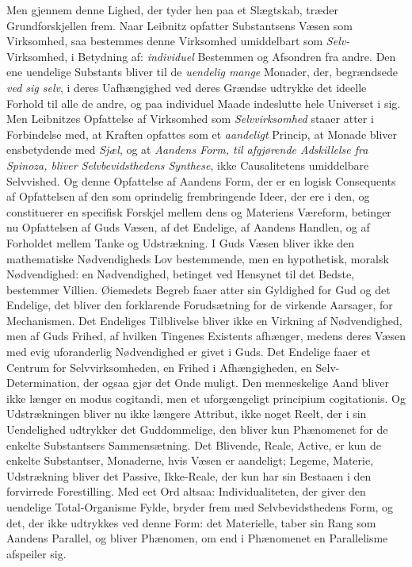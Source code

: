 \documentclass[12pt,a4paper]{book}
\newcommand{\opage}[1]{\marginnote{\footnotesize\textit{[#1]}}}
\begin{document}
Men gjennem denne Lighed, der tyder hen paa et Slægtskab,
træder Grundforskjellen frem. Naar Leibnitz opfatter
Substantsens Væsen som Virksomhed, saa bestemmes denne
Virksomhed umiddelbart som \emph{Selv-}Virksomhed, i Betydning
af: \emph{individuel} Bestemmen og Afsondren fra andre. Den
ene uendelige Substants bliver til de \emph{uendelig mange}
Monader, der, begrændsede \emph{ved sig selv}, i deres Uafhængighed
ved deres Grændse udtrykke det ideelle Forhold
til alle de andre, og paa individuel Maade indeslutte hele
Universet i sig. Men Leibnitzes Opfattelse af Virksomhed
som \emph{Selvvirksomhed} staaer atter i Forbindelse med, at
\opage{185} Kraften opfattes som et \emph{aandeligt} Princip, at Monade
bliver ensbetydende med \emph{Sjæl}, og at \emph{Aandens Form,
til afgjørende Adskillelse fra Spinoza, bliver Selvbevidsthedens
Synthese}, ikke Causalitetens umiddelbare
Selvvished. Og denne Opfattelse af Aandens Form, der er
en logisk Consequents af Opfattelsen af den som oprindelig
frembringende Ideer, der ere i den, og constituerer en specifisk
Forskjel mellem dens og Materiens Væreform, betinger
nu Opfattelsen af Guds Væsen, af det Endelige, af Aandens
Handlen, og af Forholdet mellem Tanke og Udstrækning.
I Guds Væsen bliver ikke den mathematiske Nødvendigheds
Lov bestemmende, men en hypothetisk, moralsk Nødvendighed:
en Nødvendighed, betinget ved Hensynet til det Bedste,
bestemmer Villien. Øiemedets Begreb faaer atter sin Gyldighed
for Gud og det Endelige, det bliver den forklarende
Forudsætning for de virkende Aarsager, for Mechanismen.
Det Endeliges Tilblivelse bliver ikke en Virkning af Nødvendighed,
men af Guds Frihed, af hvilken Tingenes Existents
afhænger, medens deres Væsen med evig uforanderlig
Nødvendighed er givet i Guds. Det Endelige faaer et
Centrum for Selvvirksomheden, en Frihed i Afhængigheden,
en Selv-Determination, der ogsaa gjør det Onde muligt.
Den menneskelige Aand bliver ikke længer en modus cogitandi,
men et uforgængeligt principium cogitationis. Og
Udstrækningen bliver nu ikke længere Attribut, ikke noget
Reelt, der i sin Uendelighed udtrykker det Guddommelige,
den bliver kun Phænomenet for de enkelte Substantsers
Sammensætning. Det Blivende, Reale, Active, er kun de
enkelte Substantser, Monaderne, hvis Væsen er aandeligt;
Legeme, Materie, Udstrækning bliver det Passive, Ikke-Reale,
der kun har sin Bestaaen i den forvirrede Forestilling. Med
eet Ord altsaa: Individualiteten, der giver den uendelige
Total-Organisme Fylde, bryder frem med Selvbevidsthedens
Form, og det, der ikke udtrykkes ved denne Form: det Materielle,
taber sin Rang som Aandens Parallel, og bliver
Phænomen, om end i Phænomenet en Parallelisme afspeiler
sig.
\end{document}
